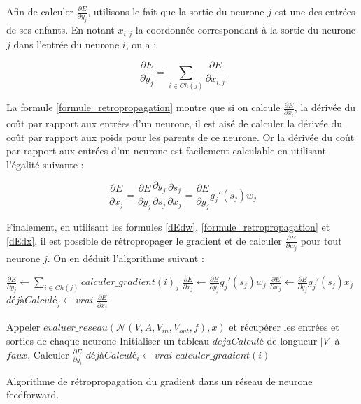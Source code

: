 \documentclass{report}
\begin{document}
Afin de calculer $\frac{\partial E}{\partial y_j}$, utilisons le fait que la sortie du neurone $j$ est une des entrées de ses enfants. En notant $x_{i, j}$ la coordonnée correspondant à la sortie du neurone $j$ dans l'entrée du neurone $i$, on a :

\begin{equation}
\frac{\partial E}{\partial y_j} = \sum_{i \in Ch(j)}{\frac{\partial E}{\partial x_{i,j}}}
\label{formule_retropropagation}
\end{equation}

La formule \ref{formule_retropropagation} montre que si on calcule $\frac{\partial E}{\partial x_i}$, la dérivée du coût par rapport aux entrées d'un neurone, il est aisé de calculer la dérivée du coût par rapport aux poids pour les parents de ce neurone. Or la dérivée du coût par rapport aux entrées d'un neurone est facilement calculable en utilisant l'égalité suivante :

\begin{equation}
\frac{\partial E}{\partial x_j} = \frac{\partial E}{\partial y_j}\frac{\partial y_j}{\partial s_j}\frac{\partial s_j}{\partial x_j} =  \frac{\partial E}{\partial y_j} g_j'(s_j) w_j
\label{dEdx}
\end{equation}

Finalement, en utilisant les formules \ref{dEdw}, \ref{formule_retropropagation} et \ref{dEdx}, il est possible de rétropropager le gradient et de calculer $\frac{\partial E}{\partial w_j}$ pour tout neurone $j$. On en déduit l'algorithme suivant :

\begin{algorithm} 
\begin{algorithmic}
		\State $\frac{\partial E}{\partial y_j} \leftarrow \sum_{i \in Ch(j)}{calculer\_gradient(i)_j}$
		\State $\frac{\partial E}{\partial x_j} \leftarrow \frac{\partial E}{\partial y_j} g_j'(s_j) w_j$
		\State $\frac{\partial E}{\partial w_j} \leftarrow \frac{\partial E}{\partial y_j} g_j'(s_j) x_j$
		\State $déjàCalculé_j \leftarrow vrai$
	\EndIf
	\State \Return $\frac{\partial E}{\partial x_j}$
\EndFunction

\State Appeler $evaluer\_reseau(\mathcal{N}(V, A, V_{in}, V_{out}, f), x)$ et récupérer les entrées et sorties de chaque neurone
\State Initialiser un tableau $dejaCalculé$ de longueur $|V|$ à $faux$.
	\State Calculer $\frac{\partial E}{\partial y_i}$
	\State $déjàCalculé_i \leftarrow vrai$ 
\EndFor
{}
	\State $calculer\_gradient(i)$ 
\EndFor
\EndProcedure
\end{algorithmic} 
\caption{Algorithme de rétropropagation du gradient dans un réseau de neurone feedforward.}
\label{propagation_memoisation}
\end{algorithm}
\end{document}
